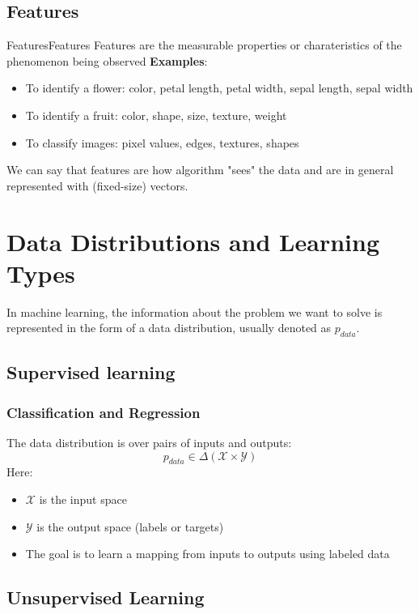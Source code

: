 \documentclass[a4paper]{article}
\theoremstyle{definition}
\begin{document}
\subsection{Features}
\begin{definition}{Features}{Features}
Features are the measurable properties or charateristics of the phenomenon being observed
\vspace{1em}
\noindent
\newline
\textbf{Examples}:
\begin{itemize}
    \item To identify a flower: color, petal length, petal width, sepal length, sepal width 
    \item To identify a fruit: color, shape, size, texture, weight 
    \item To classify images: pixel values, edges, textures, shapes 
\end{itemize}
We can say that features are how algorithm "sees" the data and are in general represented 
with (fixed-size) vectors.
\end{definition}

\section{Data Distributions and Learning Types}
In machine learning, the information about the problem we want to solve
is represented in the form of a data distribution, usually denoted as \( p_{data} \).
\subsection{Supervised learning}
\subsubsection{Classification and Regression}
The data distribution is over pairs of inputs and outputs:
\[
  p_{data} \in \Delta(\mathcal{X} \times \mathcal{Y})
\]
Here:
\begin{itemize}
    \item \( \mathcal{X} \) is the input space 
    \item \( \mathcal{Y} \) is the output space (labels or targets)
    \item The goal is to learn a mapping from inputs to outputs using labeled data
\end{itemize}
\subsection{Unsupervised Learning}
\end{document}
